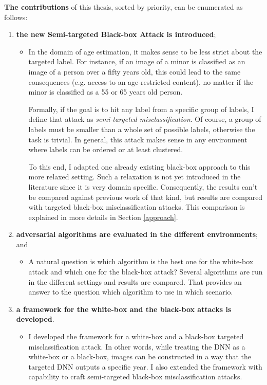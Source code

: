 \textbf{The contributions} of this thesis, sorted by priority, can be enumerated as follows:
\begin{enumerate}

\item \textbf{the new Semi-targeted Black-box Attack is introduced};
	\begin{itemize}
	\item In the domain of age estimation, it makes sense to be less strict about the targeted label. For instance, if an image of a minor is classified as an image of a person over a fifty years old, this could lead to the same consequences (e.g. access to an age-restricted content), no matter if the minor is classified as a 55 or 65 years old person. 
	
	Formally, if the goal is to hit any label from a specific group of labels, I define that attack as \textit{semi-targeted misclassification}. Of course, a group of labels must be smaller than a whole set of possible labels, otherwise the task is trivial. In general, this attack makes sense in any environment where labels can be ordered or at least clustered.

To this end, I adapted one already existing black-box approach to this more relaxed setting. Such a relaxation is not yet introduced in the literature since it is very domain specific. Consequently, the results can't be compared against previous work of that kind, but results are compared with targeted black-box misclassification attacks. This comparison is explained in more details in Section \ref{approach}. 
	\end{itemize}
	
\item \textbf{adversarial algorithms are evaluated in the different environments}; and
	\begin{itemize}
		\item A natural question is which algorithm is the best one for the white-box attack and which one for the black-box attack? Several algorithms are run in the different settings and results are compared. That provides an answer to the question which algorithm to use in which scenario.
	\end{itemize}

\item \textbf{a framework for the white-box and the black-box attacks is developed}.
	\begin{itemize}
	\item I developed the framework for a white-box and a black-box targeted misclassification attack. In other words, while treating the DNN as a white-box or a black-box, images can be constructed in a way that the targeted DNN outputs a specific year. I also extended the framework with capability to craft semi-targeted black-box misclassification attacks.
	\end{itemize}
\end{enumerate}

